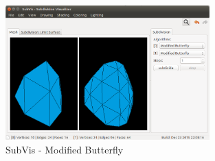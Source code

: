 \begin{figure}
  \centering
  \includegraphics[width=0.7\textwidth]{content/media/sd_modbutterfly_screenshot.png}
  \caption{SubVis - Modified Butterfly}
  \label{fig:sd_modbutterfly_screenshot}
\end{figure}














